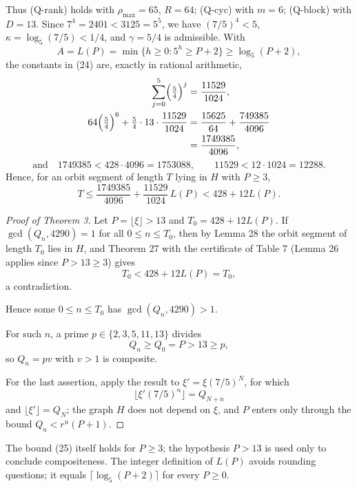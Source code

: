 \documentclass[11pt,reqno]{amsart}
\theoremstyle{definition}
\theoremstyle{remark}
\begin{document}
Thus (Q-rank) holds with \(\rho_{\max}=65\), \(R=64\); (Q-cyc) with
\(m=6\); (Q-block) with \(D=13\). Since \(7^4=2401<3125=5^5\), we have
\((7/5)^4<5\), \(\kappa=\log_5(7/5)<1/4\), and \(\gamma=5/4\) is
admissible. With
\[
A=L(P)=\min\{h\ge0:5^h\ge P+2\}\ge\log_5(P+2),
\]
the
constants in (24) are, exactly in rational arithmetic,
\[
\begin{aligned}
\sum_{j=0}^{5}\Bigl(\tfrac54\Bigr)^j&=\frac{11529}{1024},\\
64\Bigl(\tfrac54\Bigr)^6+\tfrac54\cdot13\cdot\frac{11529}{1024}
&=\frac{15625}{64}+\frac{749385}{4096}\\
&=\frac{1749385}{4096},
\end{aligned}
\]
\[
\text{and}\quad
1749385<428\cdot4096=1753088,\qquad 11529<12\cdot1024=12288.
\]
Hence, for an orbit segment of length \(T\) lying in \(H\) with
\(P\ge3\),
\[
T\le\frac{1749385}{4096}+\frac{11529}{1024}\,L(P)<428+12L(P).
\tag{25}\label{eq:25}
\]

\begin{proof}[Proof of Theorem 3]\leavevmode\label{proof:3}
Let \(P=\lfloor\xi\rfloor>13\) and
\(T_0=428+12L(P)\). If \(\gcd(Q_n,4290)=1\) for all
\(0\le n\le T_0\), then by Lemma 28 the orbit segment of length \(T_0\)
lies in \(H\), and Theorem 27 with the certificate of Table 7 (Lemma 26
applies since \(P>13\ge3\)) gives
\[
T_0<428+12L(P)=T_0,
\]
a
contradiction.

Hence some \(0\le n\le T_0\) has
\(\gcd(Q_n,4290)>1\).

For such \(n\), a prime \(p\in\{2,3,5,11,13\}\)
divides
\[
Q_n\ge Q_0=P>13\ge p,
\]
so \(Q_n=pv\) with \(v>1\) is
composite.

For the last assertion, apply the result to
\(\xi'=\xi(7/5)^N\), for which
\[
\lfloor\xi'(7/5)^n\rfloor=Q_{N+n}
\]
and
\(\lfloor\xi'\rfloor=Q_N\); the graph \(H\) does not depend on \(\xi\),
and \(P\) enters only through the bound \(Q_u<r^u(P+1)\). \qedhere
\end{proof}

The bound (25) itself holds for \(P\ge3\); the hypothesis \(P>13\) is
used only to conclude compositeness. The integer definition of \(L(P)\)
avoids rounding questions; it equals \(\lceil\log_5(P+2)\rceil\) for
every \(P\ge0\).

\end{document}
